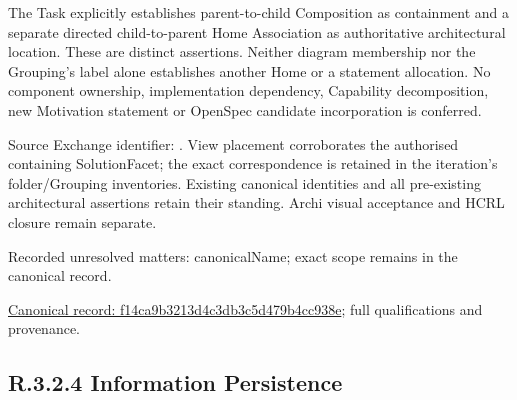 The Task explicitly establishes parent-to-child Composition as containment and
a separate directed child-to-parent Home Association as authoritative architectural
location. These are distinct assertions. Neither diagram membership nor the
Grouping's label alone establishes another Home or a statement allocation.
No component ownership, implementation dependency, Capability decomposition,
new Motivation statement or OpenSpec candidate incorporation is conferred.



Source Exchange identifier: \texttt{}. View placement corroborates
the authorised containing SolutionFacet; the exact correspondence is retained in the
iteration's folder/Grouping inventories. Existing canonical identities and all
pre-existing architectural assertions retain their standing. Archi visual
acceptance and HCRL closure remain separate.


{\small Recorded unresolved matters: canonicalName; exact scope remains in the canonical record.}\par
{\footnotesize \href{../../../../../../../continuum/grouping/f14ca9b3213d4c3db3c5d479b4cc938e.md}{Canonical record: f14ca9b3213d4c3db3c5d479b4cc938e}; full qualifications and provenance.}\par
\subsection*{R.3.2.4 Information Persistence}
\label{navigation:R.3.2.4}

